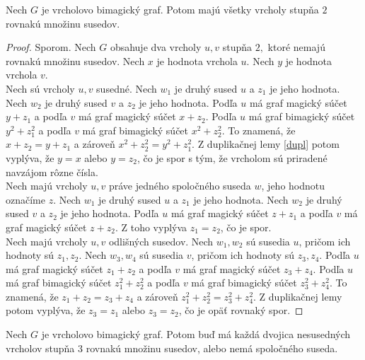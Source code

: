 \begin{theorem}
\label{vbgdegree2}
Nech $G$ je vrcholovo bimagický graf. Potom majú všetky vrcholy stupňa $2$ rovnakú množinu susedov.
\end{theorem}

\begin{proof} Sporom. Nech $G$ obsahuje dva vrcholy $u,v$ stupňa $2,$ ktoré nemajú rovnakú množinu susedov. Nech $x$ je hodnota vrchola $u$. Nech $y$ je hodnota vrchola $v$. \\

Nech sú vrcholy $u,v$ susedné. Nech $w_1$ je druhý sused $u$ a $z_1$ je jeho hodnota. Nech $w_2$ je druhý sused $v$ a $z_2$ je jeho hodnota. Podľa $u$ má graf magický súčet $y + z_1$ a podľa $v$ má graf magický súčet $x + z_2$. Podľa $u$ má graf bimagický súčet $y^2 + z^2_1$ a podľa $v$ má graf bimagický súčet $x^2 + z^2_2$.  To znamená, že $x + z_2 = y + z_1$ a zároveň $x^2 + z^2_2 = y^2 + z^2_1$. Z duplikačnej lemy \ref{dupl} potom vyplýva, že $y = x$ alebo $y = z_2$, čo je spor s tým, že vrcholom sú priradené navzájom rôzne čísla. \\

Nech majú vrcholy $u,v$ práve jedného spoločného suseda $w$, jeho hodnotu označíme $z$. Nech $w_1$ je druhý sused $u$ a $z_1$ je jeho hodnota. Nech $w_2$ je druhý sused $v$ a $z_2$ je jeho hodnota. Podľa $u$ má graf magický súčet $z + z_1$ a podľa $v$ má graf magický súčet $z + z_2$. Z toho vyplýva $z_1 = z_2$, čo je spor. \\

Nech majú vrcholy $u,v$ odlišných susedov. Nech $w_1, w_2$ sú susedia $u$, pričom ich hodnoty sú $z_1, z_2$. Nech $w_3, w_4$ sú susedia $v$, pričom ich hodnoty sú $z_3, z_4$. Podľa $u$ má graf magický súčet $z_1 + z_2$ a podľa $v$ má graf magický súčet $z_3 + z_4$. Podľa $u$ má graf bimagický súčet $z^2_1 + z^2_2$ a podľa $v$ má graf bimagický súčet $z^2_3 + z^2_4$. To znamená, že $z_1 + z_2 = z_3 + z_4$ a zároveň $z^2_1 + z^2_2 = z^2_3 + z^2_4$. Z duplikačnej lemy potom vyplýva, že $z_3 = z_1$ alebo $z_3 = z_2$, čo je opäť rovnaký spor.
\end{proof}

\begin{theorem} 
\label{vbgdegree3}
Nech $G$ je vrcholovo bimagický graf. Potom buď má každá dvojica nesusedných vrcholov stupňa $3$ rovnakú množinu susedov, alebo nemá spoločného suseda.
\end{theorem}

